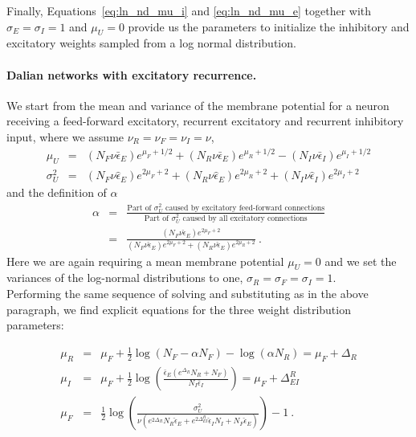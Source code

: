 \documentclass[11pt,a4paper]{article}
\begin{document}
\begin{refsection}
Finally, Equations~\eqref{eq:ln_nd_mu_i} and \eqref{eq:ln_nd_mu_e} together with $\sigma_E=\sigma_I = 1$ and $\mu_U=0$ provide us the parameters to initialize the inhibitory and excitatory weights sampled from a log normal distribution.
\paragraph{Dalian networks with excitatory recurrence.}
We start from the mean and variance of the membrane potential for a neuron receiving a feed-forward excitatory, recurrent excitatory and recurrent inhibitory input, where we assume $\nu_R=\nu_F=\nu_I=\nu$,
\begin{eqnarray}
    \mu_U &=& \left(N_{F}\nu\bar\epsilon_{E}\right)e^{\mu_F + 1/2} + \left(N_{R}\nu\bar\epsilon_{E}\right)e^{\mu_R + 1/2} - \left(N_{I}\nu\bar\epsilon_{I}\right)e^{\mu_I + 1/2}\\
    \sigma^2_{U} &=&\left(N_{F}\nu\hat\epsilon_{E}\right)e^{2\mu_F + 2} + \left(N_{R}\nu\hat\epsilon_{E}\right)e^{2\mu_R + 2} + \left(N_{I}\nu\hat\epsilon_{I}\right)e^{2\mu_I + 2} 
\end{eqnarray}
and the definition of $\alpha$
\begin{eqnarray}
    \alpha &=& \frac{\text{Part of }\sigma_U^2 \text{ caused by excitatory feed-forward connections}}{\text{Part of }\sigma_U^2 \text{ caused by all excitatory connections}}\\
    &=& \frac{\left(N_{F}\nu\hat\epsilon_{E}\right)e^{2\mu_F + 2}} {\left(N_{F}\nu\hat\epsilon_{E}\right)e^{2\mu_F + 2} + \left(N_{R}\nu\hat\epsilon_{E}\right)e^{2\mu_R + 2}}  ~.
\end{eqnarray}
Here we are again requiring a mean membrane potential $\mu_U=0$ and we set the variances of the log-normal distributions to one, $\sigma_R = \sigma_F = \sigma_I = 1$.\\
Performing the same sequence of solving and substituting as in the above paragraph, we find explicit equations for the three weight distribution parameters:

\begin{eqnarray}
    \mu_R &=& \mu_F + \frac{1}{2} \log \left(N_F - \alpha N_F \right) - \log \left(\alpha N_R \right) = \mu_F + \Delta_{R}\\
    \mu_I &=& \mu_F + \frac{1}{2} \log \left( \frac{\bar\epsilon_E\left(e^{\Delta_{R}} N_R + N_F \right)}{N_I \bar\epsilon_I} \right) = \mu_F + \Delta_{EI}^R\\
    \mu_F &=& \frac{1}{2}\log \left( \frac{ \sigma_U^2 }{ \nu \left( e^{2\Delta_R} N_R \hat\epsilon_E + e^{2\Delta_{EI}^R} \hat\epsilon_I N_I + N_F \hat\epsilon_E \right) } \right) -1  ~.
\end{eqnarray}
 
\printbibliography
\end{refsection}
\end{document}
